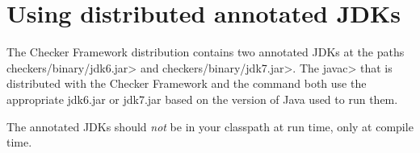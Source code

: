 \section{Using distributed annotated JDKs\label{skeleton-using}\label{skeleton}}

The Checker Framework distribution contains two
annotated JDKs at the paths \<checkers/binary/jdk6.jar> and
\<checkers/binary/jdk7.jar>.
The \<javac> that is distributed with the Checker Framework and the command
 both use the appropriate jdk6.jar or jdk7.jar
based on the version of Java used to run them.

The annotated JDKs should \emph{not} be in your classpath at run time, only
at compile time.




%
%
%
%
%
%
%



